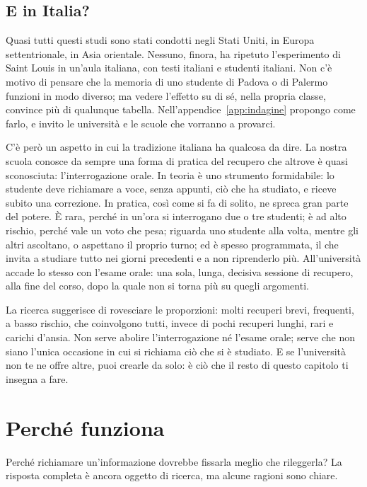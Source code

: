 \subsection*{E in Italia?}

Quasi tutti questi studi sono stati condotti negli Stati Uniti, in
Europa settentrionale, in Asia orientale. Nessuno, finora, ha ripetuto
l'esperimento di Saint Louis in un'aula italiana, con testi italiani e
studenti italiani. Non c'è motivo di pensare che la memoria di uno
studente di Padova o di Palermo funzioni in modo diverso; ma vedere
l'effetto su di sé, nella propria classe, convince più di qualunque
tabella. Nell'appendice~\ref{app:indagine} propongo come farlo, e invito le università e
le scuole che vorranno a provarci.

C'è però un aspetto in cui la tradizione italiana ha qualcosa da dire.
La nostra scuola conosce da sempre una forma di pratica del recupero che
altrove è quasi sconosciuta: l'interrogazione orale. In teoria è uno
strumento formidabile: lo studente deve richiamare a voce, senza
appunti, ciò che ha studiato, e riceve subito una correzione. In
pratica, così come si fa di solito, ne spreca gran parte del potere. È
rara, perché in un'ora si interrogano due o tre studenti; è ad alto
rischio, perché vale un voto che pesa; riguarda uno studente alla volta,
mentre gli altri ascoltano, o aspettano il proprio turno; ed è spesso
programmata, il che invita a studiare tutto nei giorni precedenti e a
non riprenderlo più. All'università accade lo stesso con l'esame orale:
una sola, lunga, decisiva sessione di recupero, alla fine del corso,
dopo la quale non si torna più su quegli argomenti.

La ricerca suggerisce di rovesciare le proporzioni: molti recuperi
brevi, frequenti, a basso rischio, che coinvolgono tutti, invece di
pochi recuperi lunghi, rari e carichi d'ansia. Non serve abolire
l'interrogazione né l'esame orale; serve che non siano l'unica
occasione in cui si richiama ciò che si è studiato. E se l'università
non te ne offre altre, puoi crearle da solo: è ciò che il resto di
questo capitolo ti insegna a fare.

\section{Perché funziona}

Perché richiamare un'informazione dovrebbe fissarla meglio che
rileggerla? La risposta completa è ancora oggetto di ricerca, ma alcune
ragioni sono chiare.

